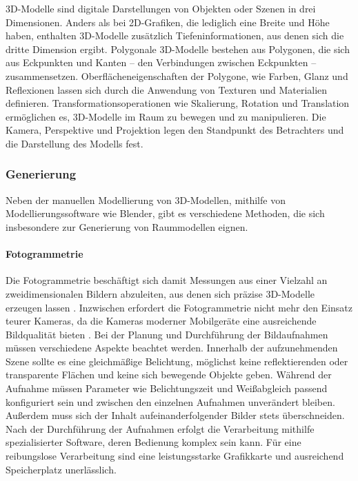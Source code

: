 3D-Modelle sind digitale Darstellungen von Objekten oder Szenen in drei Dimensionen. Anders als bei 2D-Grafiken, die lediglich eine Breite und Höhe haben, enthalten 3D-Modelle zusätzlich Tiefeninformationen, aus denen sich die dritte Dimension ergibt. Polygonale 3D-Modelle bestehen aus Polygonen, die sich aus Eckpunkten und Kanten – den Verbindungen zwischen Eckpunkten – zusammensetzen. Oberflächeneigenschaften der Polygone, wie Farben, Glanz und Reflexionen lassen sich durch die Anwendung von Texturen und Materialien definieren. Transformationsoperationen wie Skalierung, Rotation und Translation ermöglichen es, 3D-Modelle im Raum zu bewegen und zu manipulieren. Die Kamera, Perspektive und Projektion legen den Standpunkt des Betrachters und die Darstellung des Modells fest.\cite[S.~8-16]{Parisi2014}

\subsubsection{Generierung}
Neben der manuellen Modellierung von 3D-Modellen, mithilfe von Modellierungssoftware wie Blender, gibt es verschiedene Methoden, die sich insbesondere zur Generierung von Raummodellen eignen.

\paragraph{Fotogrammetrie}

Die Fotogrammetrie beschäftigt sich damit Messungen aus einer Vielzahl an zweidimensionalen Bildern abzuleiten, aus denen sich präzise 3D-Modelle erzeugen lassen \cite[S.~19]{Aber2010}. Inzwischen erfordert die Fotogrammetrie nicht mehr den Einsatz teurer Kameras, da die Kameras moderner Mobilgeräte eine ausreichende Bildqualität bieten \cite{Cohrs2021}. Bei der Planung und Durchführung der Bildaufnahmen müssen verschiedene Aspekte beachtet werden. Innerhalb der aufzunehmenden Szene sollte es eine gleichmäßige Belichtung, möglichst keine reflektierenden oder transparente Flächen und keine sich bewegende Objekte geben. Während der Aufnahme müssen Parameter wie Belichtungszeit und Weißabgleich passend konfiguriert sein und zwischen den einzelnen Aufnahmen unverändert bleiben. Außerdem muss sich der Inhalt aufeinanderfolgender Bilder stets überschneiden.\cite{Cohrs2021b} Nach der Durchführung der Aufnahmen erfolgt die Verarbeitung mithilfe spezialisierter Software, deren Bedienung komplex sein kann. Für eine reibungslose Verarbeitung sind eine leistungsstarke Grafikkarte und ausreichend Speicherplatz unerlässlich.\cite{Cohrs2021c}

